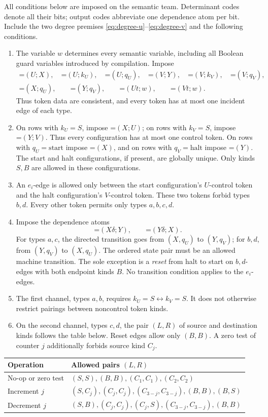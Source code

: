 \documentclass[11pt,a4paper]{article}
\newcommand{\dep}[2]{\mathord{=}(#1;#2)}
\newcommand{\con}[1]{\mathord{=}(#1)}
\theoremstyle{definition}
\begin{document}
All conditions below are imposed on the semantic team. Determinant
codes denote all their bits; output codes abbreviate one dependence
atom per bit.
Include the two degree premises
\eqref{eq:degree-u}--\eqref{eq:degree-v} and the following conditions.
\begin{enumerate}[label=\textup{(\arabic*)}]
\item The variable $w$ determines every semantic variable, including
      all Boolean guard variables introduced by compilation. Impose
\[
 \begin{gathered}
 \dep U X,\quad \dep U{k_U},\quad \dep U{q_U},\quad
 \dep V Y,\quad \dep V{k_V},\quad \dep V{q_V},\\
 \dep X{q_U},\qquad \dep Y{q_V},\qquad
 \dep{Ut}w,\qquad\dep{Vt}w.
 \end{gathered}
\]
Thus token data are consistent, and every token has at most one
incident edge of each type.
\item On rows with $k_U=S$, impose $\dep X U$; on rows with $k_V=S$,
impose $\dep Y V$. Thus every configuration has at most one control
token. On rows with $q_U=\mathrm{start}$ impose $\con X$, and on
rows with $q_V=\mathrm{halt}$ impose $\con Y$. The start and halt
configurations, if present, are globally unique. Only kinds $S,B$
are allowed in these configurations.
\item An $e_i$-edge is allowed only between the start configuration's
$U$-control token and the halt configuration's $V$-control token.
These two tokens forbid types $b,d$. Every other token permits only
types $a,b,c,d$.
\item Impose the dependence atoms
\[
 \dep{X\delta}Y,\qquad \dep{Y\delta}X.
\]
For types $a,c$, the directed transition goes from $(X,q_U)$ to
$(Y,q_V)$; for $b,d$, from $(Y,q_V)$ to $(X,q_U)$. The ordered state
pair must be an allowed machine transition. The sole exception is
a \emph{reset} from halt to start on $b,d$-edges with both endpoint
kinds $B$. No transition condition applies to the $e_i$-edges.
\item The first channel, types $a,b$, requires
$k_U=S\leftrightarrow k_V=S$. It does not otherwise restrict
pairings between noncontrol token kinds.
\item On the second channel, types $c,d$, the pair $(L,R)$ of source
and destination kinds follows the table below. Reset edges allow
only $(B,B)$. A zero test of counter $j$ additionally forbids source
kind $C_j$.
\end{enumerate}
\begin{center}
\small
\begin{tabular}{@{}ll@{}}
\toprule
Operation & Allowed pairs $(L,R)$\\
\midrule
No-op or zero test & $(S,S),(B,B),(C_1,C_1),(C_2,C_2)$\\
Increment $j$ & $(S,C_j),(C_j,C_j),(C_{3-j},C_{3-j}),(B,B),(B,S)$\\
Decrement $j$ & $(S,B),(C_j,C_j),(C_j,S),(C_{3-j},C_{3-j}),(B,B)$\\
\bottomrule
\end{tabular}
\end{center}
\end{document}
